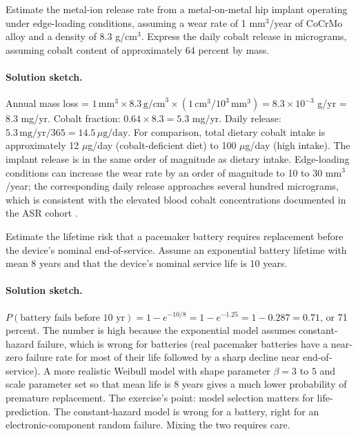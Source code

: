\begin{exercise}
Estimate the metal-ion release rate from a metal-on-metal hip
implant operating under edge-loading conditions, assuming a wear
rate of 1 mm$^3$/year of CoCrMo alloy and a density of 8.3
g/cm$^3$. Express the daily cobalt release in micrograms, assuming
cobalt content of approximately 64 percent by mass.
\end{exercise}

\paragraph{Solution sketch.}
Annual mass loss = $1 \,\text{mm}^3 \times 8.3 \,\text{g/cm}^3
\times (1\,\text{cm}^3 / 10^3\,\text{mm}^3) = 8.3 \times 10^{-3}$
g/yr = 8.3 mg/yr. Cobalt fraction: $0.64 \times 8.3 = 5.3$ mg/yr.
Daily release: $5.3 \,\text{mg/yr} / 365 = 14.5 \,\mu\text{g/day}$.
For comparison, total dietary cobalt intake is approximately
12 $\mu$g/day (cobalt-deficient diet) to 100 $\mu$g/day (high
intake). The implant release is in the same order of magnitude as
dietary intake. Edge-loading conditions can increase the wear rate
by an order of magnitude to 10 to 30 mm$^3$/year; the corresponding
daily release approaches several hundred micrograms, which is
consistent with the elevated blood cobalt concentrations
documented in the ASR cohort \cite{paper:v6c12-cohen-mom-bmj-2012,
paper:v6c12-langton-asr-2011}.

\begin{exercise}
Estimate the lifetime risk that a pacemaker battery requires
replacement before the device's nominal end-of-service. Assume an
exponential battery lifetime with mean 8 years and that the
device's nominal service life is 10 years.
\end{exercise}

\paragraph{Solution sketch.}
$P(\text{battery fails before 10 yr}) = 1 - e^{-10/8} = 1 - e^{-1.25}
= 1 - 0.287 = 0.71$, or 71 percent. The number is high because the
exponential model assumes constant-hazard failure, which is wrong
for batteries (real pacemaker batteries have a near-zero failure rate
for most of their life followed by a sharp decline near end-of-
service). A more realistic Weibull model with shape parameter $\beta
= 3$ to $5$ and scale parameter set so that mean life is 8 years
gives a much lower probability of premature replacement. The
exercise's point: model selection matters for life-prediction. The
constant-hazard model is wrong for a battery, right for an
electronic-component random failure. Mixing the two requires care.

